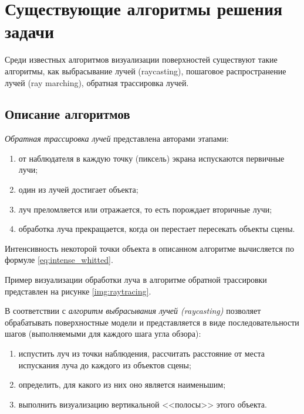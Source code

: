 \section{Существующие алгоритмы решения задачи}

Среди известных алгоритмов визуализации поверхностей существуют такие алгоритмы, как выбрасывание лучей (raycasting), пошаговое распространение лучей (ray marching), обратная трассировка лучей.

\subsection{Описание алгоритмов}

\textit{Обратная трассировка лучей} представлена авторами \cite{порев2002компьютерная} этапами:
\begin{enumerate}
	\item от наблюдателя в каждую точку (пиксель) экрана испускаются первичные лучи;
	\item один из лучей достигает объекта;
	\item луч преломляется или отражается, то есть порождает вторичные лучи;
	\item обработка луча прекращается, когда он перестает пересекать объекты сцены.
\end{enumerate}

Интенсивность некоторой точки объекта в описанном алгоритме вычисляется по формуле \ref{eq:intense_whitted}.

Пример визуализации обработки луча в алгоритме обратной трассировки представлен на рисунке \ref{img:raytracing}.


В соответствии с \cite{евстратов2020создание} \textit{алгоритм выбрасывания лучей (raycasting)} позволяет обрабатывать поверхностные модели и представляется в виде последовательности шагов (выполняемыми для каждого шага угла обзора):
\begin{enumerate}
	\item испустить луч из точки наблюдения, рассчитать расстояние от места испускания луча до каждого из объектов сцены;
	\item определить, для какого из них оно является наименьшим;
	\item выполнить визуализацию вертикальной <<полосы>> этого объекта.
\end{enumerate}

